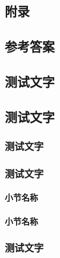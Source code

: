 \documentclass[color=orange,openany]{textbook-cn}
\begin{document}
\begin{Appendix}






\part*{附录}

\chapter{参考答案}
\tcbinputrecords

\chapter{测试文字}

\chapter*{测试文字}




\section{测试文字}

\lipsum[1-4]

\section{测试文字}
\subsection{小节名称}
\lipsum[1-4]

\subsection{小节名称}
\lipsum[1-2]

\Example{\lipsum[1][1-6]}
\Example{\lipsum[1][1-6]}

\Variety{\lipsum[1][1-6]}
\Variety{\lipsum[1][1-6]}

\lipsum[3-4]

\section*{测试文字}
\lipsum[1-8]
\RelaInfo{\lipsum[1-2]}

\DeepThink{\lipsum[2]}


\end{Appendix}
\end{document}
